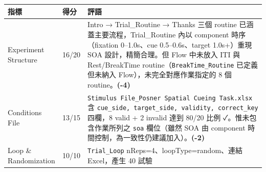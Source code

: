 \documentclass[14pt,]{extarticle}
\begin{document}
\begin{longtable}[]{@{}lll@{}}
\toprule
\begin{minipage}[b]{0.09\columnwidth}\raggedright
指標\strut
\end{minipage} & \begin{minipage}[b]{0.09\columnwidth}\raggedright
得分\strut
\end{minipage} & \begin{minipage}[b]{0.09\columnwidth}\raggedright
評語\strut
\end{minipage}\tabularnewline
\midrule
\endhead
\begin{minipage}[t]{0.09\columnwidth}\raggedright
Experiment Structure\strut
\end{minipage} & \begin{minipage}[t]{0.09\columnwidth}\raggedright
16/20\strut
\end{minipage} & \begin{minipage}[t]{0.09\columnwidth}\raggedright
Intro → Trial\_Routine → Thanks 三個 routine
已涵蓋主要流程，Trial\_Routine 內以 component 時序（fixation
0--1.0s、cue 0.5--0.6s、target 1.0s+）重現 SOA 設計，精簡合理。但 Flow
中未放入 ITI 與 Rest/BreakTime routine（\texttt{BreakTime\_Routine}
已定義但未納入 Flow），未完全對應作業指定的 8 個
routine。\textbf{(-4)}\strut
\end{minipage}\tabularnewline
\begin{minipage}[t]{0.09\columnwidth}\raggedright
Conditions File\strut
\end{minipage} & \begin{minipage}[t]{0.09\columnwidth}\raggedright
13/15\strut
\end{minipage} & \begin{minipage}[t]{0.09\columnwidth}\raggedright
\texttt{Stimulus\ File\_Posner\ Spatial\ Cueing\ Task.xlsx} 含
\texttt{cue\_side,\ target\_side,\ validity,\ correct\_key} 四欄，8
valid + 2 invalid 達到 80/20 比例 ✓。惟未包含作業所列之 \texttt{soa}
欄位（雖然 SOA 由 component
時間控制，為一致性仍建議加入）。\textbf{(-2)}\strut
\end{minipage}\tabularnewline
\begin{minipage}[t]{0.09\columnwidth}\raggedright
Loop \& Randomization\strut
\end{minipage} & \begin{minipage}[t]{0.09\columnwidth}\raggedright
10/10\strut
\end{minipage} & \begin{minipage}[t]{0.09\columnwidth}\raggedright
\texttt{Trial\_Loop} nReps=4、loopType=random、連結 Excel，產生 40 試驗

\end{minipage}
\end{longtable}
\end{document}
